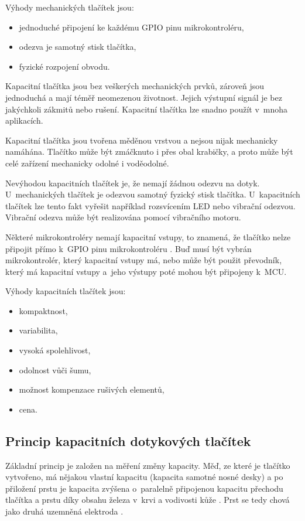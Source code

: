 Výhody mechanických tlačítek jsou:
\begin{itemize}
  \item jednoduché připojení ke každému GPIO pinu mikrokontroléru,
  \item odezva je samotný stisk tlačítka,
  \item fyzické rozpojení obvodu.
\end{itemize}

Kapacitní tlačítka jsou bez veškerých mechanických prvků, zároveň jsou jednoduchá a mají téměř neomezenou 
životnost. Jejich výstupní signál je bez jakýchkoli zákmitů nebo rušení. Kapacitní tlačítka lze snadno použít v~mnoha aplikacích. 

Kapacitní tlačítka jsou tvořena měděnou vrstvou a nejsou nijak mechanicky namáhána. Tlačítko může být zmáčknuto i přes 
obal krabičky, a proto může být celé zařízení mechanicky odolné i voděodolné. 

Nevýhodou kapacitních tlačítek je, že nemají žádnou odezvu na dotyk. U~mechanických tlačítek je odezvou samotný fyzický 
stisk tlačítka. U~kapacitních tlačítek lze tento fakt vyřešit například rozsvícením LED nebo vibrační odezvou. Vibrační 
odezva může být realizována pomocí vibračního motoru. 

Některé mikrokontroléry nemají kapacitní vstupy, to znamená, že tlačítko nelze připojit přímo k~GPIO pinu mikrokontroléru \cite{ESP_C3_dtsh}. 
Buď musí být vybrán mikrokontrolér, který kapacitní vstupy má, nebo může být použit převodník, který má kapacitní vstupy a~jeho 
výstupy poté mohou být připojeny k~MCU. 

Výhody kapacitních tlačítek jsou:
\begin{itemize}
  \item kompaktnost,
  \item variabilita,
  \item vysoká spolehlivost,
  \item odolnost vůči šumu,
  \item možnost kompenzace rušivých elementů,
  \item cena. 
\end{itemize}

\subsection{Princip kapacitních dotykových tlačítek}
Základní princip je založen na měření změny kapacity. Měď, ze které je tlačítko vytvořeno, má
nějakou vlastní kapacitu (kapacita samotné nosné desky) a po přiložení prstu je kapacita zvýšena o~paralelně 
připojenou kapacitu přechodu tlačítka a prstu díky obsahu železa v~krvi a vodivosti kůže \cite{PrincipKapTl}. 
Prst se tedy chová jako druhá uzemněná elektroda \cite{PrincipKapTl}. 

